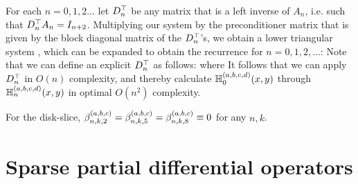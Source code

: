 For each $n = 0,1,2\dots$ let $D^\top_n$ be any matrix that is a left inverse of $A_n$, i.e. such that $D^\top_n A_n = I_{n+2}$. Multiplying our system by the preconditioner matrix that is given by the block diagonal matrix of the $D^\top_n$'s, we obtain a lower triangular system \cite[p78]{dunkl2014orthogonal}, which can be expanded to obtain the recurrence for $n = 0,1,2,\dots$:
Note that we can define an explicit $D^\top_n$ as follows:
 where
It follows that we can apply $D^\top_n$ in $O(n)$ complexity, and thereby calculate $\mathbb{H}^{(a,b,c,d)}_{0}(x,y)$  through $\mathbb{H}^{(a,b,c,d)}_{n}(x,y)$ in optimal $O(n^2)$ complexity.

For the disk-slice, $\beta^{(a,b,c)}_{n,k,2} = \beta^{(a,b,c)}_{n,k,5} = \beta^{(a,b,c)}_{n,k,8} \equiv 0$ for any $n, k$.

%
\section{Sparse partial differential operators}\label{Section:PDOs}

